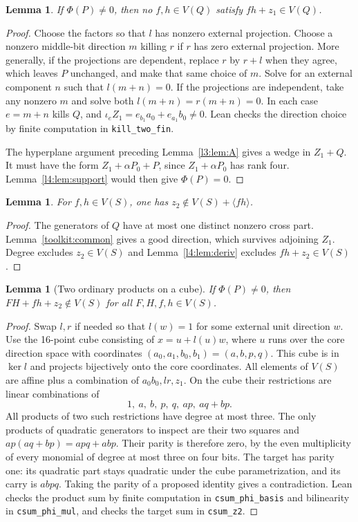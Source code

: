 \documentclass[11pt,a4paper]{article}
\theoremstyle{plain}
\newtheorem{lemma}[theorem]{Lemma}
\theoremstyle{remark}
\theoremstyle{plain}
\begin{document}
\begin{lemma}\label{l2:lem:early}
If $\Phi(P)\ne0$, then no $f,h\in V(Q)$ satisfy $fh+z_1\in V(Q)$.
\end{lemma}
\begin{proof}
Choose the factors so that $l$ has nonzero external projection. Choose a nonzero middle-bit direction $m$ killing $r$ if $r$ has zero external projection. More generally, if the projections are dependent, replace $r$ by $r+l$ when they agree, which leaves $P$ unchanged, and make that same choice of $m$. Solve for an external component $n$ such that $l(m+n)=0$. If the projections are independent, take any nonzero $m$ and solve both $l(m+n)=r(m+n)=0$. In each case $e=m+n$ kills $Q$, and $\iota_eZ_1=e_{b_1}a_0+e_{a_1}b_0\ne0$. Lean checks the direction choice by finite computation in \nolinkurl{kill_two_fin}.

The hyperplane argument preceding Lemma~\ref{l3:lem:A} gives a wedge in $Z_1+Q$. It must have the form $Z_1+\alpha P_0+P$, since $Z_1+\alpha P_0$ has rank four. Lemma~\ref{l4:lem:support} would then give $\Phi(P)=0$.
\end{proof}

\begin{lemma}\label{l2:lem:onebase}
For $f,h\in V(S)$, one has $z_2\notin V(S)+\langle fh\rangle$.
\end{lemma}
\begin{proof}
The generators of $Q$ have at most one distinct nonzero cross part. Lemma~\ref{toolkit:common} gives a good direction, which survives adjoining $Z_1$. Degree excludes $z_2\in V(S)$ and Lemma~\ref{l4:lem:deriv} excludes $fh+z_2\in V(S)$.
\end{proof}

\clearpage
\begin{lemma}[Two ordinary products on a cube]\label{l2:lem:cube}
If $\Phi(P)\ne0$, then $FH+fh+z_2\notin V(S)$ for all $F,H,f,h\in V(S)$.
\end{lemma}
\begin{proof}
Swap $l,r$ if needed so that $l(w)=1$ for some external unit direction $w$. Use the 16-point cube consisting of $x=u+l(u)w$, where $u$ runs over the core direction space with coordinates $(a_0,a_1,b_0,b_1)=(a,b,p,q)$. This cube is in $\ker l$ and projects bijectively onto the core coordinates. All elements of $V(S)$ are affine plus a combination of $a_0b_0,lr,z_1$. On the cube their restrictions are linear combinations of
\[
1,\ a,\ b,\ p,\ q,\ ap,\ aq+bp.
\]
All products of two such restrictions have degree at most three. The only products of quadratic generators to inspect are their two squares and $ap(aq+bp)=apq+abp$. Their parity is therefore zero, by the even multiplicity of every monomial of degree at most three on four bits. The target has parity one: its quadratic part stays quadratic under the cube parametrization, and its carry is $abpq$. Taking the parity of a proposed identity gives a contradiction. Lean checks the product sum by finite computation in \nolinkurl{csum_phi_basis} and bilinearity in \nolinkurl{csum_phi_mul}, and checks the target sum in \nolinkurl{csum_z2}.
\end{proof}
\end{document}
